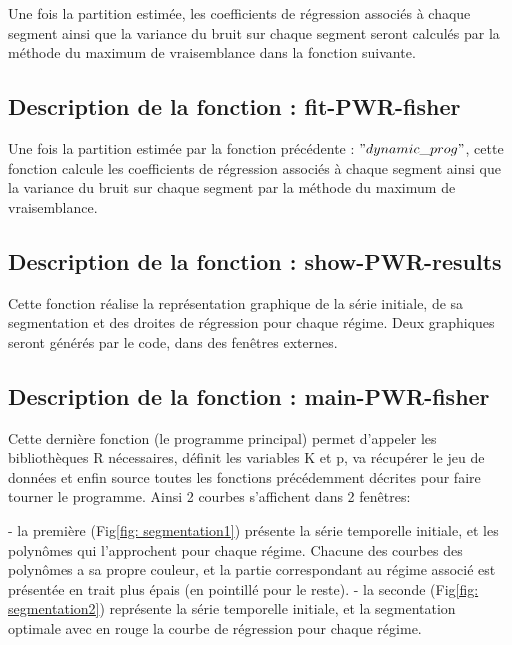 \documentclass[12pt]{article}
\begin{document}
Une fois la partition estimée, les coefficients de régression associés à chaque segment ainsi que la variance du bruit sur chaque segment seront calculés par la méthode du maximum de vraisemblance dans la fonction suivante.

\smallbreak
\subsection{Description de la fonction : fit-PWR-fisher}
\label{ssec: ssprog5}
\smallbreak
Une fois la partition estimée par la fonction précédente : $"dynamic\_prog"$, cette fonction calcule les coefficients de régression associés à chaque segment ainsi que la variance du bruit sur chaque segment par la méthode du maximum de vraisemblance.
\smallbreak
\subsection{Description de la fonction : show-PWR-results}
\label{ssec: ssprog6}
\smallbreak
Cette fonction réalise la représentation graphique de la série initiale, de sa segmentation et des droites de régression pour chaque régime. Deux graphiques seront générés par le code, dans des fenêtres externes.
\smallbreak
\subsection{Description de la fonction : main-PWR-fisher}
\label{ssec: ssprog7}
\smallbreak
Cette dernière fonction (le programme principal) permet d'appeler les bibliothèques R nécessaires, définit les variables K et p, va récupérer le jeu de données et enfin source toutes les fonctions précédemment décrites pour faire tourner le programme. Ainsi 2 courbes s'affichent dans 2 fenêtres:

- la première (Fig\ref{fig: segmentation1}) présente la série temporelle initiale, et les polynômes qui l'approchent pour chaque régime. Chacune des courbes des polynômes a sa propre couleur, et la partie correspondant au régime associé est présentée en trait plus épais (en pointillé pour le reste).
- la seconde  (Fig\ref{fig: segmentation2}) représente la série temporelle initiale, et la segmentation optimale avec en rouge la courbe de régression pour chaque régime.  
\end{document}
